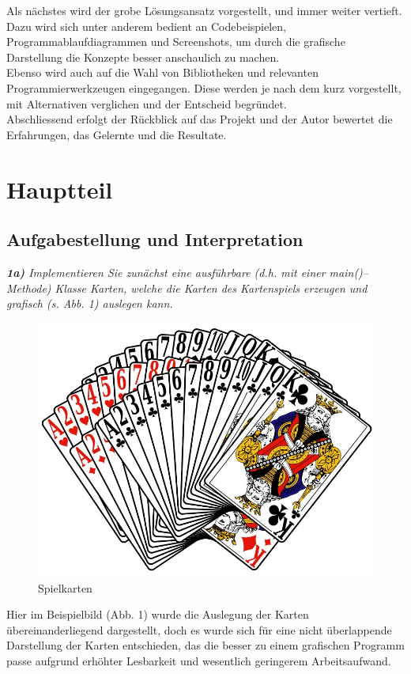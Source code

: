 \documentclass[a4paper,11pt]{article}
\begin{document}
Als nächstes wird der grobe Lösungsansatz vorgestellt, und immer weiter vertieft. Dazu wird sich unter anderem bedient an Codebeispielen, Programmablaufdiagrammen und Screenshots, um durch die grafische Darstellung die Konzepte besser anschaulich zu machen.\\

Ebenso wird auch auf die Wahl von Bibliotheken und relevanten Programmierwerkzeugen eingegangen. Diese werden je nach dem kurz vorgestellt, mit Alternativen verglichen und der Entscheid begründet.\\

Abschliessend erfolgt der Rückblick auf das Projekt und der Autor bewertet die Erfahrungen, das Gelernte und die Resultate.


\section{Hauptteil}

\subsection{Aufgabestellung und Interpretation}

\textit{\textbf{1a)} Implementieren Sie zunächst eine ausführbare (d.h. mit einer main()–Methode) Klasse Karten, welche die Karten des Kartenspiels erzeugen und grafisch (s. Abb. 1) auslegen kann.}

\begin{figure}[H]
    \centering
    \includegraphics[width=.45\textwidth]{media/spielkarten.jpg}
    \caption{Spielkarten}
\end{figure}

Hier im Beispielbild (Abb. 1) wurde die Auslegung der Karten übereinanderliegend dargestellt, doch es wurde sich für eine nicht überlappende Darstellung der Karten entschieden, das die besser zu einem grafischen Programm passe aufgrund erhöhter Lesbarkeit und wesentlich geringerem Arbeitsaufwand.\\
\end{document}
